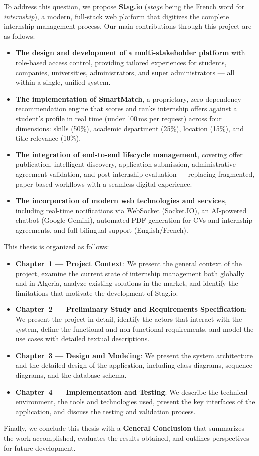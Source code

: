 To address this question, we propose \textbf{Stag.io} (\textit{stage} being the French word for \textit{internship}), a modern, full-stack web platform that digitizes the complete internship management process. Our main contributions through this project are as follows:

\begin{itemize}
    \item \textbf{The design and development of a multi-stakeholder platform} with role-based access control, providing tailored experiences for students, companies, universities, administrators, and super administrators --- all within a single, unified system.
    \item \textbf{The implementation of SmartMatch}, a proprietary, zero-dependency recommendation engine that scores and ranks internship offers against a student's profile in real time (under 100\,ms per request) across four dimensions: skills (50\%), academic department (25\%), location (15\%), and title relevance (10\%).
    \item \textbf{The integration of end-to-end lifecycle management}, covering offer publication, intelligent discovery, application submission, administrative agreement validation, and post-internship evaluation --- replacing fragmented, paper-based workflows with a seamless digital experience.
    \item \textbf{The incorporation of modern web technologies and services}, including real-time notifications via WebSocket (Socket.IO), an AI-powered chatbot (Google Gemini), automated PDF generation for CVs and internship agreements, and full bilingual support (English/French).
\end{itemize}

This thesis is organized as follows:

\begin{itemize}
    \item \textbf{Chapter~1 --- Project Context}: We present the general context of the project, examine the current state of internship management both globally and in Algeria, analyze existing solutions in the market, and identify the limitations that motivate the development of Stag.io.

    \item \textbf{Chapter~2 --- Preliminary Study and Requirements Specification}: We present the project in detail, identify the actors that interact with the system, define the functional and non-functional requirements, and model the use cases with detailed textual descriptions.

    \item \textbf{Chapter~3 --- Design and Modeling}: We present the system architecture and the detailed design of the application, including class diagrams, sequence diagrams, and the database schema.

    \item \textbf{Chapter~4 --- Implementation and Testing}: We describe the technical environment, the tools and technologies used, present the key interfaces of the application, and discuss the testing and validation process.
\end{itemize}

Finally, we conclude this thesis with a \textbf{General Conclusion} that summarizes the work accomplished, evaluates the results obtained, and outlines perspectives for future development.
